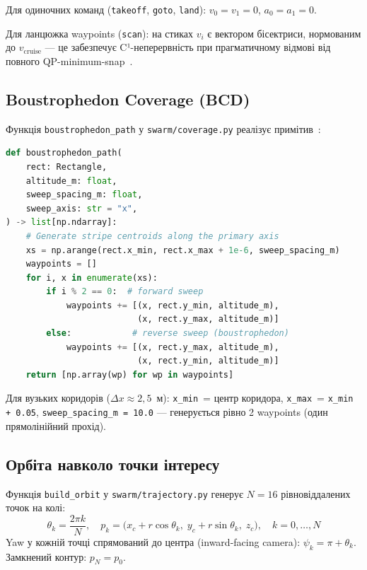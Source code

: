 Для одиночних команд (\texttt{takeoff}, \texttt{goto}, \texttt{land}): $v_0 = v_1 = 0$, $a_0 = a_1 = 0$.

Для ланцюжка waypoints (\texttt{scan}): на стиках $v_i$ є вектором бісектриси, нормованим до $v_{\text{cruise}}$ — це забезпечує C¹-неперервність при прагматичному відмові від повного QP-minimum-snap~\cite{Mellinger2011}.

\subsection{Boustrophedon Coverage (BCD)}

Функція \texttt{boustrophedon\_path} у \texttt{swarm/coverage.py} реалізує примітив~\cite{Choset2000}:

\begin{lstlisting}[language=Python, caption={Генерація BCD-waypoints для коридора}]
def boustrophedon_path(
    rect: Rectangle,
    altitude_m: float,
    sweep_spacing_m: float,
    sweep_axis: str = "x",
) -> list[np.ndarray]:
    # Generate stripe centroids along the primary axis
    xs = np.arange(rect.x_min, rect.x_max + 1e-6, sweep_spacing_m)
    waypoints = []
    for i, x in enumerate(xs):
        if i % 2 == 0:  # forward sweep
            waypoints += [(x, rect.y_min, altitude_m),
                          (x, rect.y_max, altitude_m)]
        else:            # reverse sweep (boustrophedon)
            waypoints += [(x, rect.y_max, altitude_m),
                          (x, rect.y_min, altitude_m)]
    return [np.array(wp) for wp in waypoints]
\end{lstlisting}

Для вузьких коридорів ($\Delta x \approx 2{,}5$~м): \texttt{x\_min}~= центр коридора, \texttt{x\_max}~= \texttt{x\_min + 0.05}, \texttt{sweep\_spacing\_m = 10.0} — генерується рівно 2 waypoints (один прямолінійний прохід).

\subsection{Орбіта навколо точки інтересу}

Функція \texttt{build\_orbit} у \texttt{swarm/trajectory.py} генерує $N=16$ рівновіддалених точок на колі:
\[
\theta_k = \frac{2\pi k}{N}, \quad
p_k = \bigl(x_c + r\cos\theta_k,\; y_c + r\sin\theta_k,\; z_c\bigr),\quad k=0,\ldots,N
\]
Yaw у кожній точці спрямований до центра (inward-facing camera):
$\psi_k = \pi + \theta_k$. Замкнений контур: $p_N = p_0$.

